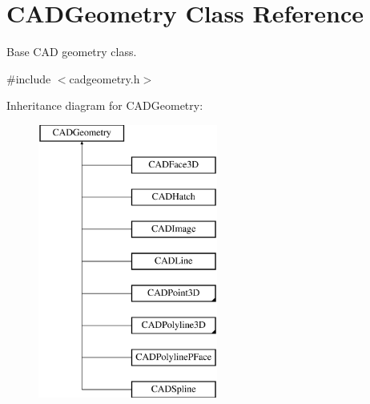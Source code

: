 \hypertarget{class_c_a_d_geometry}{}\section{C\+A\+D\+Geometry Class Reference}
\label{class_c_a_d_geometry}


Base C\+AD geometry class.  




{\ttfamily \#include $<$cadgeometry.\+h$>$}

Inheritance diagram for C\+A\+D\+Geometry\+:\begin{figure}[H]
\begin{center}
\leavevmode
\includegraphics[height=9.000000cm]{class_c_a_d_geometry}
\end{center}
\end{figure}
